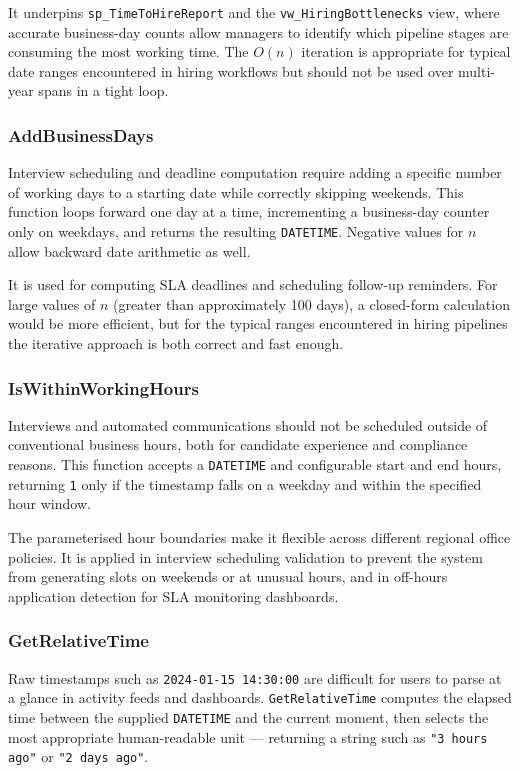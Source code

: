 \documentclass[11pt,a4paper]{article}
\begin{document}
It underpins \texttt{sp\_TimeToHireReport} and the \texttt{vw\_HiringBottlenecks} view, where accurate business-day counts allow managers to identify which pipeline stages are consuming the most working time. The $O(n)$ iteration is appropriate for typical date ranges encountered in hiring workflows but should not be used over multi-year spans in a tight loop.

\subsubsection{AddBusinessDays}
\noindent
Interview scheduling and deadline computation require adding a specific number of working days to a starting date while correctly skipping weekends. This function loops forward one day at a time, incrementing a business-day counter only on weekdays, and returns the resulting \texttt{DATETIME}. Negative values for $n$ allow backward date arithmetic as well.

It is used for computing SLA deadlines and scheduling follow-up reminders. For large values of $n$ (greater than approximately 100 days), a closed-form calculation would be more efficient, but for the typical ranges encountered in hiring pipelines the iterative approach is both correct and fast enough.

\subsubsection{IsWithinWorkingHours}
\noindent
Interviews and automated communications should not be scheduled outside of conventional business hours, both for candidate experience and compliance reasons. This function accepts a \texttt{DATETIME} and configurable start and end hours, returning \texttt{1} only if the timestamp falls on a weekday and within the specified hour window.

The parameterised hour boundaries make it flexible across different regional office policies. It is applied in interview scheduling validation to prevent the system from generating slots on weekends or at unusual hours, and in off-hours application detection for SLA monitoring dashboards.

\subsubsection{GetRelativeTime}
\noindent
Raw timestamps such as \texttt{2024-01-15 14:30:00} are difficult for users to parse at a glance in activity feeds and dashboards. \texttt{GetRelativeTime} computes the elapsed time between the supplied \texttt{DATETIME} and the current moment, then selects the most appropriate human-readable unit --- returning a string such as \texttt{"3 hours ago"} or \texttt{"2 days ago"}.
\end{document}

